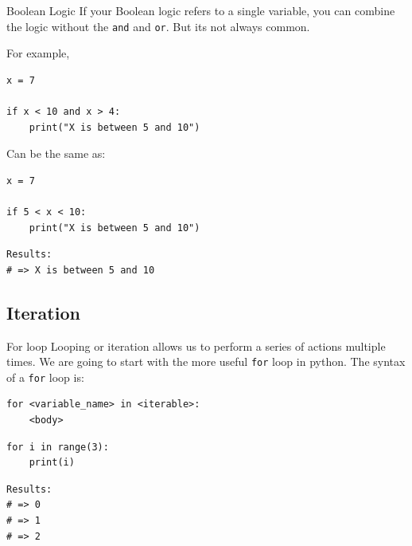 \documentclass[10pt]{beamer}
\begin{document}
\begin{frame}[label={sec:org56feec1},fragile]{Boolean Logic}
 If your Boolean logic refers to a single variable, you can combine the logic without
the \texttt{and} and \texttt{or}. But its not always common.

For example,

\begin{verbatim}
x = 7

if x < 10 and x > 4:
    print("X is between 5 and 10")
\end{verbatim}

Can be the same as:

\begin{verbatim}
x = 7

if 5 < x < 10:
    print("X is between 5 and 10")
\end{verbatim}

\begin{verbatim}
Results: 
# => X is between 5 and 10
\end{verbatim}
\end{frame}

\subsection{Iteration}
\label{sec:org46b12ef}
\begin{frame}[label={sec:org8dc3b3d},fragile]{For loop}
 Looping or iteration allows us to perform a series of actions multiple times. We are
going to start with the more useful \texttt{for} loop in python. The syntax of a \texttt{for} loop is:

\begin{verbatim}
for <variable_name> in <iterable>:
    <body>
\end{verbatim}

\begin{verbatim}
for i in range(3):
    print(i)
\end{verbatim}

\begin{verbatim}
Results: 
# => 0
# => 1
# => 2
\end{verbatim}
\end{frame}
\end{document}
